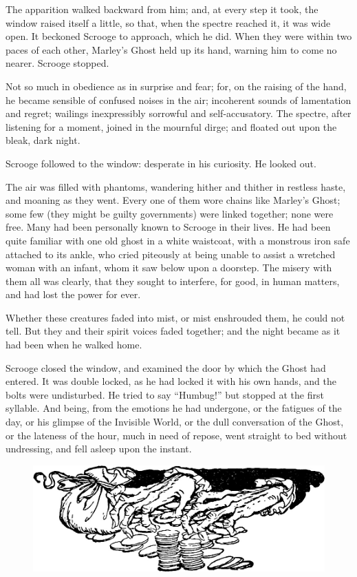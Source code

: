 \documentclass[paper=5.5in:8.5in,BCOR=7mm,twoside,DIV=calc,12pt,usegeometry]{scrbook} %
\begin{document}
The apparition walked backward from him; and, at every step it took, the window raised itself a little, so that, when the spectre reached it, it was wide open. It beckoned Scrooge to approach, which he did. When they were within two paces of each other, Marley's Ghost held up its hand, warning him to come no nearer. Scrooge stopped.

Not so much in obedience as in surprise and fear; for, on the raising of the hand, he became sensible of confused noises in the air; incoherent sounds of lamentation and regret; wailings inexpressibly sorrowful and self-accusatory. The spectre, after listening for a moment, joined in the mournful dirge; and floated out upon the bleak, dark night.

Scrooge followed to the window: desperate in his curiosity. He looked out.

The air was filled with phantoms, wandering hither and thither in restless haste, and moaning as they went. Every one of them wore chains like Marley's Ghost; some few (they might be guilty governments) were linked together; none were free. Many had been personally known to Scrooge in their lives. He had been quite familiar with one old ghost in a white waistcoat, with a monstrous iron safe attached to its ankle, who cried piteously at being unable to assist a wretched woman with an infant, whom it saw below upon a doorstep. The misery with them all was clearly, that they sought to interfere, for good, in human matters, and had lost the power for ever.

Whether these creatures faded into mist, or mist enshrouded them, he could not tell. But they and their spirit voices faded together; and the night became as it had been when he walked home.

Scrooge closed the window, and examined the door by which the Ghost had entered. It was double locked, as he had locked it with his own hands, and the bolts were undisturbed. He tried to say \enquote{Humbug!} but stopped at the first syllable. And being, from the emotions he had undergone, or the fatigues of the day, or his glimpse of the Invisible World, or the dull conversation of the Ghost, or the lateness of the hour, much in need of repose, went straight to bed without undressing, and fell asleep upon the instant.

\begin{figure}[bh]
\centering
\includegraphics[width=.7\linewidth]{handsmoney2}
\end{figure}
\end{document}
